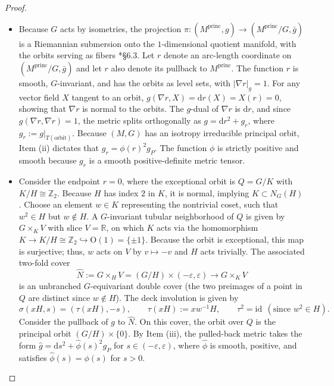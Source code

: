 \documentclass[12pt,a4paper]{amsart}
\theoremstyle{plain}
\theoremstyle{definition}
\theoremstyle{remark}
\newcommand{\ga}{\mathit{g}} %
\begin{document}
\begin{proof}
\begin{itemize}
    \item[(iii)] Because $G$ acts by isometries, the projection $\pi \colon (M^{\mathrm{princ}}, \ga) \to (M^{\mathrm{princ}}/G, \bar{\ga})$ is a Riemannian submersion onto the $1$-dimensional quotient manifold, with the orbits serving as fibers \cite{alexandrino2015lie}*{\S6.3}. Let $r$ denote an arc-length coordinate on $(M^{\mathrm{princ}}/G, \bar{\ga})$ and let $r$ also denote its pullback to $M^{\mathrm{princ}}$. The function $r$ is smooth, $G$-invariant, and has the orbits as level sets, with $|\nabla r|_{\ga} = 1$. For any vector field $X$ tangent to an orbit, $\ga(\nabla r, X) = \mathrm{d}r(X) = X(r) = 0$, showing that $\nabla r$ is normal to the orbits. The $\ga$-dual of $\nabla r$ is $\mathrm{d}r$, and since $\ga(\nabla r, \nabla r) = 1$, the metric splits orthogonally as $\ga = \mathrm{d}r^2 + \ga_r$, where $\ga_r := \ga|_{T(\text{orbit})}$. Because $(M,G)$ has an isotropy irreducible principal orbit, Item (ii) dictates that $\ga_r = \phi(r)^2 \ga_P$. The function $\phi$ is strictly positive and smooth because $\ga_r$ is a smooth positive-definite metric tensor.

    \item[(iv)] Consider the endpoint $r=0$, where the exceptional orbit is $Q = G/K$ with $K/H \cong \mathbb{Z}_2$. Because $H$ has index $2$ in $K$, it is normal, implying $K \subset N_G(H)$. Choose an element $w \in K$ representing the nontrivial coset, such that $w^2 \in H$ but $w \notin H$. A $G$-invariant tubular neighborhood of $Q$ is given by $G \times_K V$ with slice $V = \mathbb{R}$, on which $K$ acts via the homomorphism $K \to K/H \cong \mathbb{Z}_2 \hookrightarrow \mathrm{O}(1) = \{\pm1\}$. Because the orbit is exceptional, this map is surjective; thus, $w$ acts on $V$ by $v \mapsto -v$ and $H$ acts trivially. The associated two-fold cover
    \[
    \widehat{N} := G \times_H V = (G/H) \times (-\varepsilon, \varepsilon) \longrightarrow G \times_K V
    \]
    is an unbranched $G$-equivariant double cover (the two preimages of a point in $Q$ are distinct since $w \notin H$). The deck involution is given by
    \[
    \sigma(xH, s) = (\tau(xH), -s),\qquad \tau(xH) := xw^{-1}H,\qquad \tau^2 = \mathrm{id}\ \ (\text{since } w^2 \in H).
    \]
    Consider the pullback of $\ga$ to $\widehat{N}$. On this cover, the orbit over $Q$ is the principal orbit $(G/H) \times \{0\}$. By Item (iii), the pulled-back metric takes the form $\widehat{\ga} = \mathrm{d}s^2 + \widehat{\phi}(s)^2 \ga_P$ for $s \in (-\varepsilon, \varepsilon)$, where $\widehat{\phi}$ is smooth, positive, and satisfies $\widehat{\phi}(s) = \phi(s)$ for $s > 0$.


\end{itemize}
\end{proof}
\end{document}
